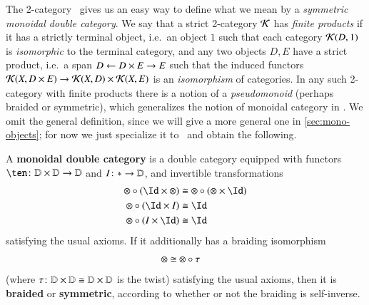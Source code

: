 The 2-category \cDbl\ gives us an easy way to define what we mean by a
\emph{symmetric monoidal double category}.
We say that a strict 2-category $\mathcal{K}$ has \emph{finite products} if it has a strictly terminal object, i.e.\ an object $1$ such that each category $\mathcal{K}(D,1)$ is \emph{isomorphic} to the terminal category, and any two objects $D,E$ have a strict product, i.e.\ a span $D \leftarrow D\times E \to E$ such that the induced functors $\mathcal{K}(X,D\times E) \to \mathcal{K}(X,D) \times \mathcal{K}(X,E)$ is an \emph{isomorphism} of categories.
In any such 2-category with finite products there is a notion of a \emph{pseudomonoid} (perhaps braided or symmetric), which generalizes the notion of monoidal category in \cCat.
We omit the general definition, since we will give a more general one in \cref{sec:mono-objects};
for now we just specialize it to \cDbl\ and obtain the following.

\begin{defn}\label{def:symmondoub}
  A \textbf{monoidal double category} is a double category equipped
  with functors $\ten\maps \lD\times\lD\to\lD$ and $I\colon * \to\mathbb{D}$,
  and invertible transformations
  \begin{align*}
    \mathord{\otimes} \circ (\Id\times \mathord{\otimes})
    &\iso \mathord{\otimes} \circ (\mathord{\otimes} \times \Id)\\
    \mathord{\otimes} \circ (\Id\times I) &\iso \Id\\
    \mathord{\otimes} \circ (I\times \Id) &\iso \Id
  \end{align*}
  satisfying the usual axioms.  If it additionally has a braiding
  isomorphism
  \begin{align*}
    \mathord{\otimes} &\cong \mathord{\otimes} \circ \tau
  \end{align*}
  (where $\tau\colon \mathbb{D}\times\mathbb{D}\cong \mathbb{D}\times\mathbb{D}$ is the twist)
  satisfying the usual axioms, then it is \textbf{braided} or
  \textbf{symmetric}, according to whether or not the braiding is
  self-inverse.
\end{defn}

